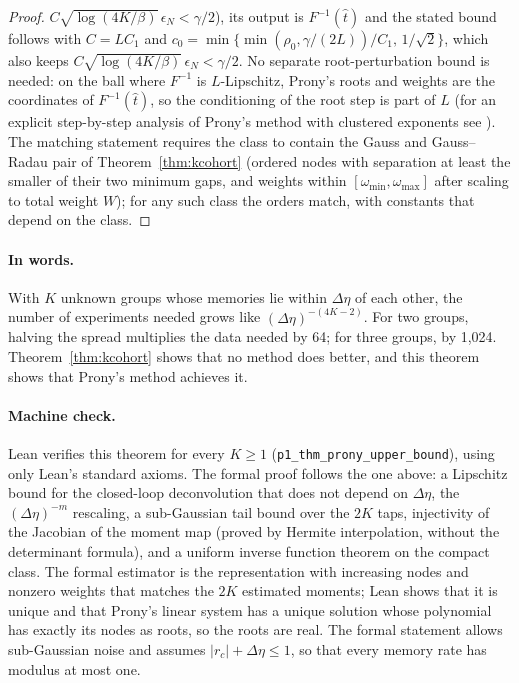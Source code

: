 \begin{proof}
$C\sqrt{\log(4K/\beta)}\,\epsilon_N<\gamma/2$), its output is $F^{-1}(\hat t)$ and the stated bound follows with $C=LC_1$ and $c_0=\min\{\min(\rho_0,\gamma/(2L))/C_1,\,1/\sqrt2\}$, which also keeps $C\sqrt{\log(4K/\beta)}\,\epsilon_N<\gamma/2$. No separate root-perturbation bound is needed: on the ball where $F^{-1}$ is $L$-Lipschitz, Prony's roots and weights are the coordinates of $F^{-1}(\hat t)$, so the conditioning of the root step is part of $L$ (for an explicit step-by-step analysis of Prony's method with clustered exponents see \citealp{katz2023}). The matching statement requires the class to contain the Gauss and Gauss--Radau pair of Theorem~\ref{thm:kcohort} (ordered nodes with separation at least the smaller of their two minimum gaps, and weights within $[\omega_{\min},\omega_{\max}]$ after scaling to total weight $W$); for any such class the orders match, with constants that depend on the class.
\end{proof}

\paragraph{In words.} With $K$ unknown groups whose memories lie within $\Delta\eta$ of each other, the number of experiments needed grows like $(\Delta\eta)^{-(4K-2)}$. For two groups, halving the spread multiplies the data needed by 64; for three groups, by 1{,}024. Theorem~\ref{thm:kcohort} shows that no method does better, and this theorem shows that Prony's method achieves it.

\paragraph{Machine check.} Lean verifies this theorem for every $K\ge1$ (\texttt{p1\_thm\_prony\_upper\_bound}), using only Lean's standard axioms. The formal proof follows the one above: a Lipschitz bound for the closed-loop deconvolution that does not depend on $\Delta\eta$, the $(\Delta\eta)^{-m}$ rescaling, a sub-Gaussian tail bound over the $2K$ taps, injectivity of the Jacobian of the moment map (proved by Hermite interpolation, without the determinant formula), and a uniform inverse function theorem on the compact class. The formal estimator is the representation with increasing nodes and nonzero weights that matches the $2K$ estimated moments; Lean shows that it is unique and that Prony's linear system has a unique solution whose polynomial has exactly its nodes as roots, so the roots are real. The formal statement allows sub-Gaussian noise and assumes $|r_c|+\Delta\eta\le1$, so that every memory rate has modulus at most one.

